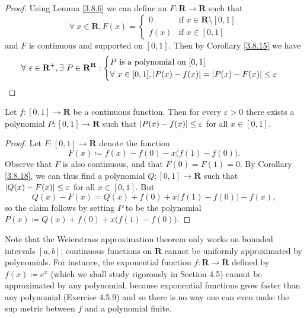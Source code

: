 \begin{proof}
    Using Lemma \ref{3.8.6} we can define an \(F : \mathbf{R} \to \mathbf{R}\) such that
    \[
        \forall\ x \in \mathbf{R}, F(x) = \begin{cases}
            0    & \text{if } x \in \mathbf{R} \setminus [0, 1] \\
            f(x) & \text{if } x \in [0, 1]
        \end{cases}
    \]
    and \(F\) is continuous and supported on \([0, 1]\).
    Then by Corollary \ref{3.8.15} we have
    \[
        \forall\ \varepsilon \in \mathbf{R}^+, \exists\ P \in \mathbf{R}^{\mathbf{R}} : \begin{cases}
            P \text{ is a polynomial on } [0, 1] \\
            \forall\ x \in [0, 1], \abs*{P(x) - f(x)} = \abs*{P(x) - F(x)} \leq \varepsilon
        \end{cases}
    \]
\end{proof}

\begin{corollary}\label{3.8.19}
    Let \(f : [0, 1] \to \mathbf{R}\) be a continuous function.
    Then for every \(\varepsilon > 0\) there exists a polynomial \(P : [0, 1] \to \mathbf{R}\) such that \(\abs*{P(x) - f(x)} \leq \varepsilon\) for all \(x \in [0, 1]\).
\end{corollary}

\begin{proof}
    Let \(F : [0, 1] \to \mathbf{R}\) denote the function
    \[
        F(x) \coloneqq f(x) - f(0) - x \big(f(1) - f(0)\big).
    \]
    Observe that \(F\) is also continuous, and that \(F(0) = F(1) = 0\).
    By Corollary \ref{3.8.18}, we can thus find a polynomial \(Q : [0, 1] \to \mathbf{R}\) such that \(\abs*{Q(x) - F(x)} \leq \varepsilon\) for all \(x \in [0, 1]\).
    But
    \[
        Q(x) - F(x) = Q(x) + f(0) + x \big(f(1) - f(0)\big) - f(x),
    \]
    so the claim follows by setting \(P\) to be the polynomial \(P(x) \coloneqq Q(x) + f(0) + x \big(f(1) - f(0)\big)\).
\end{proof}

\begin{remark}\label{3.8.20}
    Note that the Weierstrass approximation theorem only works on bounded intervals \([a, b]\);
    continuous functions on \(\mathbf{R}\) cannot be uniformly approximated by polynomials.
    For instance, the exponential function \(f : \mathbf{R} \to \mathbf{R}\) defined by \(f(x) \coloneqq e^x\) (which we shall study rigorously in Section 4.5) cannot be approximated by any polynomial, because exponential functions grow faster than any polynomial (Exercise 4.5.9) and so there is no way one can even make the sup metric between \(f\) and a polynomial finite.
\end{remark}

